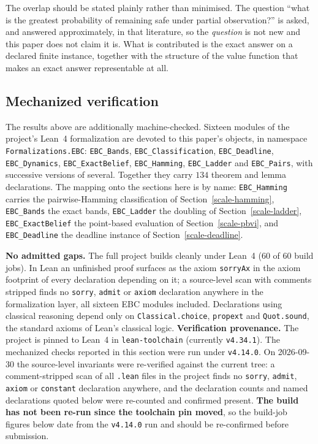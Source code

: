 \documentclass[10pt,twocolumn]{article}
\theoremstyle{plain}
\theoremstyle{definition}
\theoremstyle{remark}
\begin{document}
The overlap should be stated plainly rather than minimised. The question ``what is the
greatest probability of remaining safe under partial observation?'' is asked, and answered
approximately, in that literature, so the \emph{question} is not new and this paper does
not claim it is. What is contributed is the exact answer on a declared finite instance,
together with the structure of the value function that makes an exact answer representable
at all.

\subsection{Mechanized verification}
\label{scale-mech}

The results above are additionally machine-checked. Sixteen modules of the project's
Lean~4 formalization are devoted to this paper's objects, in namespace
\texttt{Formalizations.EBC}: \texttt{EBC\_Bands}, \texttt{EBC\_Classification},
\texttt{EBC\_Deadline}, \texttt{EBC\_Dynamics}, \texttt{EBC\_ExactBelief},
\texttt{EBC\_Hamming}, \texttt{EBC\_Ladder} and \texttt{EBC\_Pairs}, with successive
versions of several. Together they carry \(134\) theorem and lemma declarations. The
mapping onto the sections here is by name: \texttt{EBC\_Hamming} carries the
pairwise-Hamming classification of Section~\ref{scale-hamming}, \texttt{EBC\_Bands} the exact
bands, \texttt{EBC\_Ladder} the doubling of Section~\ref{scale-ladder},
\texttt{EBC\_ExactBelief} the point-based evaluation of Section~\ref{scale-pbvi}, and
\texttt{EBC\_Deadline} the deadline instance of Section~\ref{scale-deadline}.

\noindent\textbf{No admitted gaps.} The full project builds cleanly under Lean~4 (\(60\) of \(60\) build jobs). In Lean an unfinished proof surfaces as the axiom
\texttt{sorryAx} in the axiom footprint of every declaration depending on it; a
source-level scan with comments stripped finds no \texttt{sorry}, \texttt{admit} or
\texttt{axiom} declaration anywhere in the formalization layer, all sixteen EBC modules
included. Declarations using classical reasoning depend only on \texttt{Classical.choice}, \texttt{propext} and \texttt{Quot.sound}, the standard axioms of Lean's classical logic.
\noindent\textbf{Verification provenance.} The project is pinned to Lean~4 in
\texttt{lean-toolchain} (currently \texttt{v4.34.1}). The mechanized checks reported in this
section were run under \texttt{v4.14.0}. On 2026-09-30 the source-level invariants were
re-verified against the current tree: a comment-stripped scan of all \texttt{.lean} files in
the project finds no \texttt{sorry}, \texttt{admit}, \texttt{axiom} or \texttt{constant}
declaration anywhere, and the declaration counts and named declarations quoted below were
re-counted and confirmed present. \textbf{The build has not been re-run since the toolchain
pin moved}, so the build-job figures below date from the \texttt{v4.14.0} run and should be
re-confirmed before submission.
\end{document}
